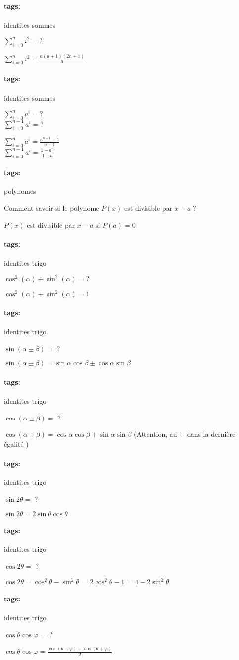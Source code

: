 \documentclass[12pt]{article}
\newcommand*{\xfield}[1]{\begin{mdframed}\centering #1\end{mdframed}\bigskip}
\newenvironment{note}{}{}
\newcommand*{\tags}[1]{\paragraph{tags: }#1}
\begin{document}
\begin{note}
	\tags{identites sommes}
    \xfield{$\sum_{i=0}^n i^2 = ?$}
    \xfield{$\sum_{i=0}^n i^2 = \frac{n(n+1)(2n+1)}{6}$}
\end{note}

\begin{note}
	\tags{identites sommes}
    \xfield{
        $\sum_{i=0}^n a^i = ? $\\        
        $\sum_{i=0}^{n-1} a^i = ? $
    }
    \xfield{$\sum_{i=0}^n a^i = \frac{a^{n+1}-1}{a-1}$\\$\sum_{i=0}^{n-1} a^i = \frac{1-a^{n}}{1-a}$}
\end{note}

\begin{note}
	\tags{polynomes}
    \xfield{Comment savoir si le polynome $P(x)$ est divisible par $x - a$ ? }
    \xfield{$P(x)$ est divisible par $x-a$ si $P(a) = 0$}
\end{note}

\begin{note}
	\tags{identites trigo}
    \xfield{$\cos^2(\alpha) + \sin^2(\alpha) = ?$}
    \xfield{$\cos^2(\alpha) + \sin^2(\alpha) = 1$}
\end{note}

\begin{note}
	\tags{identites trigo}
    \xfield{$\sin(\alpha \pm \beta) =$ ?}
    \xfield{$\sin(\alpha \pm \beta) = \sin \alpha \cos \beta \pm \cos \alpha \sin \beta$}
\end{note}

\begin{note}
	\tags{identites trigo}
    \xfield{$\cos(\alpha \pm \beta) =$ ?}
    \xfield{$\cos(\alpha \pm \beta) = \cos \alpha \cos \beta \mp \sin \alpha \sin \beta$ (Attention, au $\mp$ dans la dernière égalité )}
\end{note}

\begin{note}
	\tags{identites trigo}
    \xfield{$\sin 2\theta =$ ?}
    \xfield{$\sin 2\theta = 2 \sin \theta \cos \theta $}
\end{note}

\begin{note}
	\tags{identites trigo}
    \xfield{$\cos 2\theta =$ ?}
    \xfield{$\cos 2\theta = \cos^2 \theta - \sin^2 \theta \ = 2 \cos^2 \theta - 1\ = 1 - 2 \sin^2 \theta$}
\end{note}

\begin{note}
	\tags{identites trigo}
    \xfield{$\cos \theta \cos \varphi =$ ?}
    \xfield{$\cos \theta \cos \varphi = \frac{\cos(\theta - \varphi) + \cos(\theta + \varphi)} {2}$}
\end{note}
\end{document}
